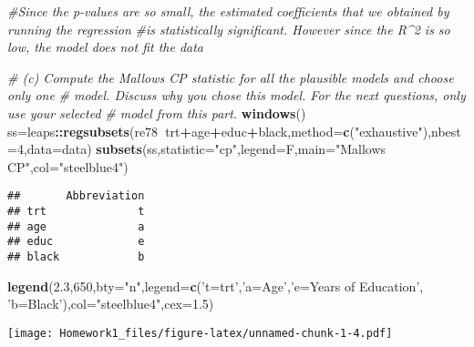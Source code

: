 \documentclass[]{article}
\newenvironment{Shaded}{\begin{snugshade}}{\end{snugshade}}
\newcommand{\KeywordTok}[1]{\textcolor[rgb]{0.13,0.29,0.53}{\textbf{#1}}}
\newcommand{\DataTypeTok}[1]{\textcolor[rgb]{0.13,0.29,0.53}{#1}}
\newcommand{\DecValTok}[1]{\textcolor[rgb]{0.00,0.00,0.81}{#1}}
\newcommand{\FloatTok}[1]{\textcolor[rgb]{0.00,0.00,0.81}{#1}}
\newcommand{\StringTok}[1]{\textcolor[rgb]{0.31,0.60,0.02}{#1}}
\newcommand{\CommentTok}[1]{\textcolor[rgb]{0.56,0.35,0.01}{\textit{#1}}}
\newcommand{\OperatorTok}[1]{\textcolor[rgb]{0.81,0.36,0.00}{\textbf{#1}}}
\newcommand{\NormalTok}[1]{#1}
\begin{document}
\begin{Shaded}
\begin{Highlighting}[]
\CommentTok{#Since the p-values are so small, the estimated coefficients that we obtained by running the regression}
\CommentTok{#is statistically significant. However since the R^2 is so low, the model does not fit the data}

\CommentTok{# (c) Compute the Mallows CP statistic for all the plausible models and choose only one}
\CommentTok{# model. Discuss why you chose this model. For the next questions, only use your selected}
\CommentTok{# model from this part.}
\KeywordTok{windows}\NormalTok{()}
\NormalTok{ss=leaps}\OperatorTok{::}\KeywordTok{regsubsets}\NormalTok{(re78}\OperatorTok{~}\NormalTok{trt}\OperatorTok{+}\NormalTok{age}\OperatorTok{+}\NormalTok{educ}\OperatorTok{+}\NormalTok{black,}\DataTypeTok{method=}\KeywordTok{c}\NormalTok{(}\StringTok{"exhaustive"}\NormalTok{),}\DataTypeTok{nbest=}\DecValTok{4}\NormalTok{,}\DataTypeTok{data=}\NormalTok{data)}
\KeywordTok{subsets}\NormalTok{(ss,}\DataTypeTok{statistic=}\StringTok{"cp"}\NormalTok{,}\DataTypeTok{legend=}\NormalTok{F,}\DataTypeTok{main=}\StringTok{"Mallows CP"}\NormalTok{,}\DataTypeTok{col=}\StringTok{"steelblue4"}\NormalTok{)}
\end{Highlighting}
\end{Shaded}

\begin{verbatim}
##       Abbreviation
## trt              t
## age              a
## educ             e
## black            b
\end{verbatim}

\begin{Shaded}
\begin{Highlighting}[]
\KeywordTok{legend}\NormalTok{(}\FloatTok{2.3}\NormalTok{,}\DecValTok{650}\NormalTok{,}\DataTypeTok{bty=}\StringTok{"n"}\NormalTok{,}\DataTypeTok{legend=}\KeywordTok{c}\NormalTok{(}\StringTok{'t=trt'}\NormalTok{,}\StringTok{'a=Age'}\NormalTok{,}\StringTok{'e=Years of Education'}\NormalTok{, }\StringTok{'b=Black'}\NormalTok{),}\DataTypeTok{col=}\StringTok{"steelblue4"}\NormalTok{,}\DataTypeTok{cex=}\FloatTok{1.5}\NormalTok{)}
\end{Highlighting}
\end{Shaded}

\texttt{[image: Homework1\_files/figure-latex/unnamed-chunk-1-4.pdf]}
\end{document}
